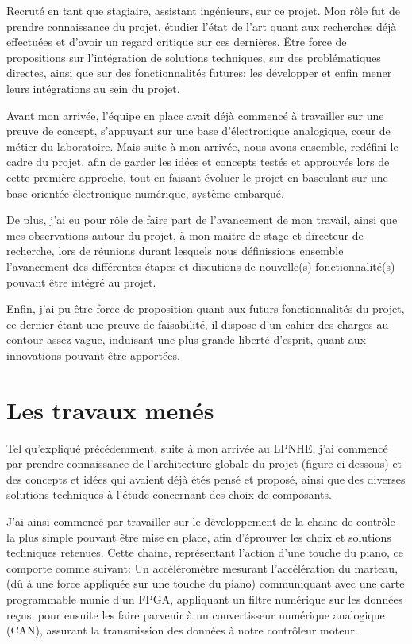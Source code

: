 \documentclass[french,a4paper,12pt]{report}
\begin{document}
	Recruté en tant que stagiaire, assistant ingénieurs, sur ce projet. Mon rôle fut de prendre connaissance du projet, étudier l'état de l'art quant aux recherches déjà effectuées et d'avoir un regard critique sur ces dernières. Être force de propositions sur l'intégration de solutions techniques, sur des problématiques directes, ainsi que sur des fonctionnalités futures; les développer et enfin mener leurs intégrations au sein du projet.
	
	Avant mon arrivée, l'équipe en place avait déjà commencé à travailler sur une preuve de concept, s'appuyant sur une base d'électronique analogique, cœur de métier du laboratoire. Mais suite à mon arrivée, nous avons ensemble, redéfini le cadre du projet, afin de garder les idées et concepts testés et approuvés lors de cette première approche, tout en faisant évoluer le projet en basculant sur une base orientée électronique numérique, système embarqué.
	
	De plus, j'ai eu pour rôle de faire part de l'avancement de mon travail, ainsi que mes observations autour du projet, à mon maitre de stage et directeur de recherche, lors de réunions durant lesquels nous définissions ensemble l'avancement des différentes étapes et discutions de nouvelle(s) fonctionnalité(s) pouvant être intégré au projet.
	
	Enfin, j'ai pu être force de proposition quant aux futurs fonctionnalités du projet, ce dernier étant une preuve de faisabilité, il dispose d'un cahier des charges au contour assez vague, induisant une plus grande liberté d'esprit, quant aux innovations pouvant être apportées.	
	
	
	\chapter{Les travaux menés}
	
	Tel qu'expliqué précédemment, suite à mon arrivée au LPNHE, j'ai commencé par prendre connaissance de l'architecture globale du projet (figure ci-dessous) et des concepts et idées qui avaient déjà étés pensé et proposé, ainsi que des diverses solutions techniques à l'étude concernant des choix de composants.
	
	J'ai ainsi commencé par travailler sur le développement de la chaine de contrôle la plus simple pouvant être mise en place, afin d'éprouver les choix et solutions techniques retenues.
	Cette chaine, représentant l'action d'une touche du piano, ce comporte comme suivant: Un accéléromètre mesurant l'accélération du marteau, (dû à une force appliquée sur une touche du piano) communiquant avec une carte programmable munie d'un FPGA, appliquant un filtre numérique sur les données reçus, pour ensuite les faire parvenir à un convertisseur numérique analogique (CAN), assurant la transmission des données à notre contrôleur moteur.\newline
	
\end{document}
